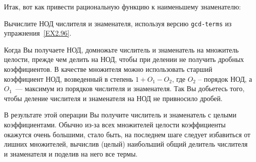 \medskip

Итак, вот как привести рациональную функцию к наименьшему знаменателю:

\begin{plainlist}

\item
Вычислите НОД числителя и знаменателя, используя
версию {\tt gcd-terms} из упражнения~\ref{EX2.96}.

\item
Когда Вы получаете НОД, домножьте числитель и
знаменатель на множитель целости, прежде чем делить на НОД, чтобы
при делении не получить дробных коэффициентов.  В качестве множителя
можно использовать старший коэффициент НОД, возведенный в степень
$1 + O_1 - O_2$, где $O_2$
-- порядок НОД, а $O_1$~---  максимум из порядков
числителя и знаменателя.  Так Вы добьетесь того, чтобы деление
числителя и знаменателя на НОД не привносило дробей.

\item
В результате этой операции Вы получите числитель и
знаменатель с целыми коэффициентами.  Обычно из-за всех множителей
целости коэффициенты окажутся очень большими, стало быть, на последнем
шаге следует избавиться от лишних множителей, вычислив (целый)
наибольший общий делитель числителя и знаменателя и поделив на него
все термы.
\end{plainlist}
